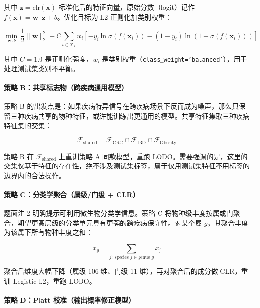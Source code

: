 \documentclass{../../latex/templates/mcm-paper}
\begin{document}
其中 $\mathbf{z}=\mathrm{clr}(\mathbf{x})$ 标准化后的特征向量，原始分数（logit）记作 $f(\mathbf{x})=\mathbf{w}^{\top}\mathbf{z}+b$。优化目标为 L2 正则化加类别权重：

\begin{equation}
\min_{\mathbf{w},b}\ \frac{1}{2}\|\mathbf{w}\|_2^2 + C \sum_{i\in\mathcal{T}_k} w_i \left[ -y_i\ln\sigma(f(\mathbf{x}_i)) - (1-y_i)\ln\!\left(1-\sigma(f(\mathbf{x}_i))\right) \right]
\label{eq:s3-l2}
\end{equation}

其中 $C=1.0$ 是正则化强度，$w_i$ 是类别权重（\texttt{class\_weight='balanced'}），用于处理测试集类别不平衡。

\paragraph{策略 B：共享标志物（跨疾病通用模型）}

策略 B 的出发点是：如果疾病特异信号在跨疾病场景下反而成为噪声，那么只保留三种疾病共享的物种特征，或许能训练出更通用的模型。共享特征集取三种疾病特征集的交集：

\begin{equation}
\mathcal{F}_{\mathrm{shared}} = \mathcal{F}_{\mathrm{CRC}} \cap \mathcal{F}_{\mathrm{IBD}} \cap \mathcal{F}_{\mathrm{Obesity}}
\label{eq:s3-shared}
\end{equation}

策略 B 在 $\mathcal{F}_{\mathrm{shared}}$ 上重训策略 A 同款模型，重跑 LODO。需要强调的是，这里的交集仅基于特征的存在性，绝不涉及测试集标签，属于仅用测试集特征不用标签的边界内的合法操作。

\paragraph{策略 C：分类学聚合（属级/门级 + CLR）}

题面注 2 明确提示可利用微生物分类学信息。策略 C 将物种级丰度按属或门聚合，期望更高层级的分类单元具有更强的跨疾病保守性。对某个属 $g$，其聚合丰度为该属下所有物种丰度之和：

\begin{equation}
x_g = \sum_{j:\ \text{species } j \in \text{genus } g} x_j
\label{eq:s3-aggregate}
\end{equation}

聚合后维度大幅下降（属级 106 维、门级 11 维），再对聚合后的成分做 CLR，重训 Logistic L2，重跑 LODO。

\paragraph{策略 D：Platt 校准（输出概率修正模型）}
\end{document}
